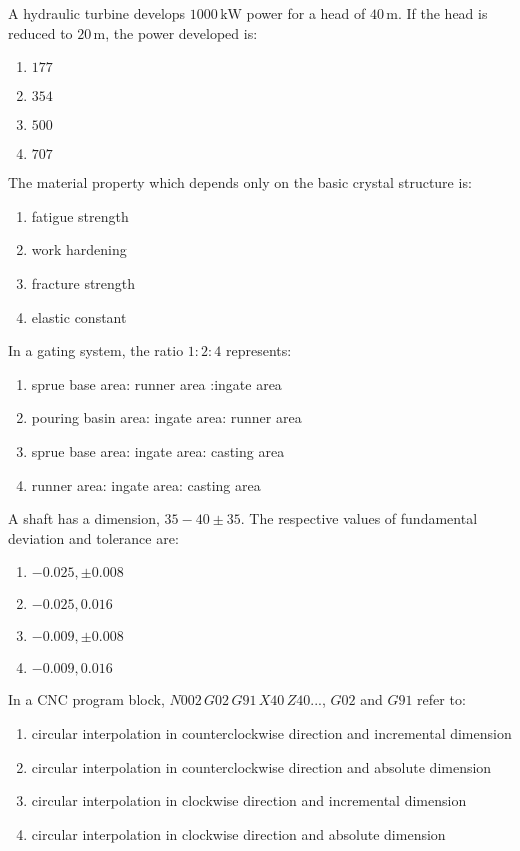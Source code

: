     \item A hydraulic turbine develops $1000 \, \text{kW}$ power for a head of $40 \, \text{m}$. If the head is reduced to $20 \, \text{m}$, the power developed  is:
    \begin{enumerate}
        \item $177$
        \item $354$
        \item $500$
        \item $707$
    \end{enumerate}

    \item The material property which depends only on the basic crystal structure is:
    \begin{enumerate}
        \item fatigue strength
        \item work hardening
        \item fracture strength
        \item elastic constant
    \end{enumerate}

    \item In a gating system, the ratio $1:2:4$ represents:
    \begin{enumerate}
        \item sprue base area: runner area :ingate area
        \item pouring basin area: ingate area: runner area
        \item sprue base area: ingate area: casting area
        \item runner area: ingate area: casting area
    \end{enumerate}

    \item A shaft has a dimension, $35-40\pm35$. The respective values of fundamental deviation and tolerance are:
    \begin{enumerate}
        \item $-0.025, \pm0.008$
        \item $-0.025, 0.016$
        \item $-0.009, \pm0.008$
        \item $-0.009, 0.016$
    \end{enumerate}

    \item In a CNC program block, $N002 \, G02 \, G91 \, X40 \, Z40...$, $G02$ and $G91$ refer to:
    \begin{enumerate}
        \item circular interpolation in counterclockwise direction and incremental dimension
        \item circular interpolation in counterclockwise direction and absolute dimension
        \item circular interpolation in clockwise direction and incremental dimension
        \item circular interpolation in clockwise direction and absolute dimension
    \end{enumerate}

